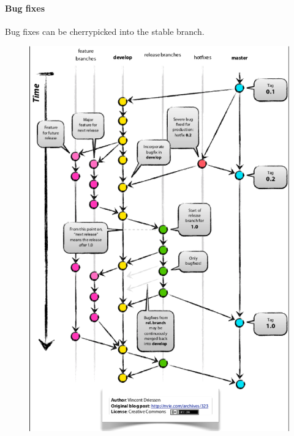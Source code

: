 \paragraph{Bug fixes}
Bug fixes can be cherry­picked into the stable branch.



\begin{figure}
\includegraphics[width=0.95\columnwidth]{img/Git-branching-model.eps}
\end{figure}



%



